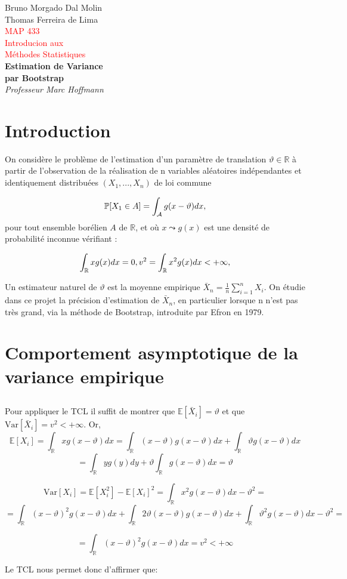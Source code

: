 \documentclass{article}
\newcommand{\mean}{\mathbb{E}}
\newcommand{\var}{\mathrm{Var}}
\newcommand{\R}{\mathbb{R}}
\newcommand*{\plogo}{\fbox{$\mathcal{PL}$}} %
\newcommand*{\titleTH}{\begingroup %
\raggedleft %
\vspace*{\baselineskip} %

{\Large Bruno Morgado Dal Molin \\ Thomas Ferreira de Lima}\\[0.167\textheight] %

{\textcolor{Red}{\huge MAP 433 \\Introducion aux \\ Méthodes Statistiques}}\\[\baselineskip] %

{\LARGE\bfseries Estimation de Variance \\par Bootstrap}\\[\baselineskip] %

{\Large \textit{Professeur Marc Hoffmann}}\par %

\vfill %
\vspace{2in}

\vspace*{3\baselineskip} %
\endgroup}
\begin{document}
\pagestyle{empty} %

\titleTH %


\section {Introduction}
	On considère le problème de l'estimation d'un paramètre de translation $\displaystyle \vartheta\in\R$
à partir de l'observation de la réalisation de n variables aléatoires indépendantes et identiquement distribuées
$\displaystyle (X_1,...,X_n)$ de loi commune

$$ \mathbb{P}[X_1\in A]= \int_{\cal A} g(x-\vartheta)dx,$$
pour tout ensemble borélien $\displaystyle A $ de $\displaystyle \R$, et où $\displaystyle x \leadsto g(x)$ est une densité de   probabilité inconnue vérifiant :

$$ \int_{\cal \R} xg(x)dx =0 , v^2 = \int_{\cal \R} x^2g(x)dx < +\infty,$$

Un estimateur naturel de $\displaystyle \vartheta$ est la moyenne empirique $\displaystyle \bar X_n = \frac{1}{n} \sum_{i=1}^n X_i$. On étudie dans ce projet la précision
d'estimation de $\displaystyle \bar X_n$, en particulier lorsque n n'est pas très grand, via la méthode de Bootstrap, introduite par Efron en 1979.
\section {Comportement asymptotique de la variance empirique}
\subsection{}
Pour appliquer le TCL il suffit de montrer que $\mean[\bar{X}_i] = \vartheta$ et que $\var[\bar{X}_i] = v^2 < +\infty $. Or,
$$\mean [X_i] = \int_{\R}xg(x-\vartheta)dx=\int_{\R}(x-\vartheta)g(x-\vartheta)dx+\int_{\R}\vartheta g(x-\vartheta)dx$$
$$=\int_{\R}y g(y)dy+\vartheta\int_{\R}g(x-\vartheta)dx= \vartheta$$

$$\var[X_i] = \mean[X_i^2] - \mean[X_i]^2 = \int_{\R}x^2g(x-\vartheta)dx - \vartheta^2 = $$
$$ = \int_{\R}(x-\vartheta)^2g(x-\vartheta)dx + \int_{\R}2\vartheta(x-\vartheta)g(x-\vartheta)dx + \int_{\R}\vartheta^2 g(x-\vartheta)dx - \vartheta^2 = $$

$$= \int_{\R}(x-\vartheta)^2g(x-\vartheta)dx = v^2 < + \infty$$

Le TCL nous permet donc d'affirmer que:
\end{document}
